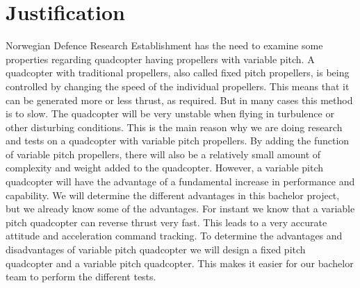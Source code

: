 \documentclass{article}
\begin{document}
\section{Justification}
Norwegian Defence Research Establishment has the need to examine some properties regarding quadcopter having propellers with variable pitch. 
\newline
\newline
A quadcopter with traditional propellers, also called fixed pitch propellers, is being controlled by changing the speed of the individual propellers. This means that it can be generated more or less thrust, as required. But in many cases this method is to slow. The quadcopter will be very unstable when flying in turbulence or other disturbing conditions. This is the main reason why we are doing research and tests on a quadcopter with variable pitch propellers. 
\newline
\newline
By adding the function of variable pitch propellers, there will also be a relatively small amount of complexity and weight added to the quadcopter. However, a variable pitch quadcopter will have the advantage of a fundamental increase in performance and capability. We will determine the different advantages in this bachelor project, but we already know some of the advantages. For instant we know that a variable pitch quadcopter can reverse thrust very fast. This leads to a very accurate attitude and acceleration command tracking. \cite{MIT}
\newline
\newline
To determine the advantages and disadvantages of variable pitch quadcopter we will design a fixed pitch quadcopter and a variable pitch quadcopter. This makes it easier for our bachelor team to perform the different tests. 



\newpage

\newpage



%

%

%

%
\end{document}
